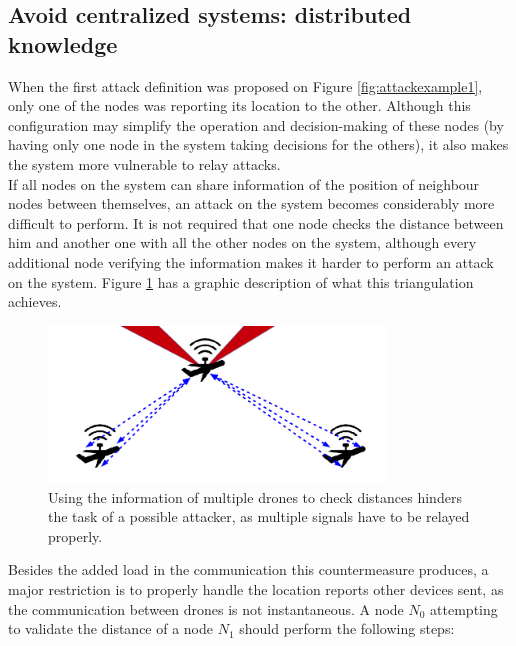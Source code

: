 \documentclass{article}
\begin{document}
\subsection{Avoid centralized systems: distributed knowledge}

When the first attack definition was proposed on Figure \ref{fig:attackexample1}, only one of the nodes was reporting its location to the other. Although this configuration may simplify the operation and decision-making of these nodes (by having only one node in the system taking decisions for the others), it also makes the system more vulnerable to relay attacks.\\

If all nodes on the system can share information of the position of neighbour nodes between themselves, an attack on the system becomes considerably more difficult to perform. It is not required that one node checks the distance between him and another one with all the other nodes on the system, although every additional node verifying the information makes it harder to perform an attack on the system. Figure \ref{fig:attackexample4} has a graphic description of what this triangulation achieves.\\

  \begin{figure}[h!]
  \centering
    \includegraphics[width=0.8\textwidth]{images/attack4.png}
  \caption{Using the information of multiple drones to check distances hinders the task of a possible attacker, as multiple signals have to be relayed properly.}
  \label{fig:attackexample4}
\end{figure}

Besides the added load in the communication this countermeasure produces, a major restriction is to properly handle the location reports other devices sent, as the communication between drones is not instantaneous. A node $N_{0}$ attempting to validate the distance of a node $N_{1}$ should perform the following steps:
\end{document}
